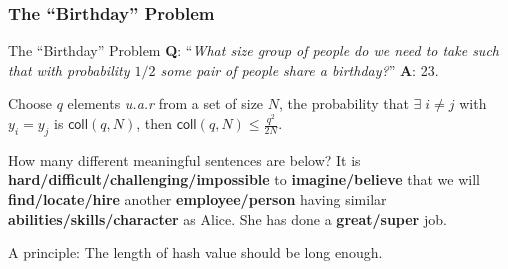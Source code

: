 \begin{frame}\frametitle{The ``Birthday'' Problem}
\begin{exampleblock}{The ``Birthday'' Problem}
\textbf{Q}: ``\emph{What size group of people do we need to take such that with probability $1/2$ some pair of people share a birthday?}''
\textbf{A}: 23.
\end{exampleblock}
\begin{lemma}
Choose $q$ elements \emph{u.a.r} from a set of size $N$, the probability that $\exists \; i \ne j$ with $y_i = y_j$ is $\mathsf{coll}(q,N)$, then 
$ \mathsf{coll}(q,N) \le \frac{q^2}{2N} $.
\end{lemma}
\begin{exampleblock}{How many different meaningful sentences are below?}
It is \textbf{hard/difficult/challenging/impossible} to \textbf{imagine/believe} that we will \textbf{find/locate/hire} another \textbf{employee/person} having similar \textbf{abilities/skills/character} as Alice. She has done a \textbf{great/super} job.
\end{exampleblock}
\alert{A principle: The length of hash value should be long enough.}
\end{frame}
